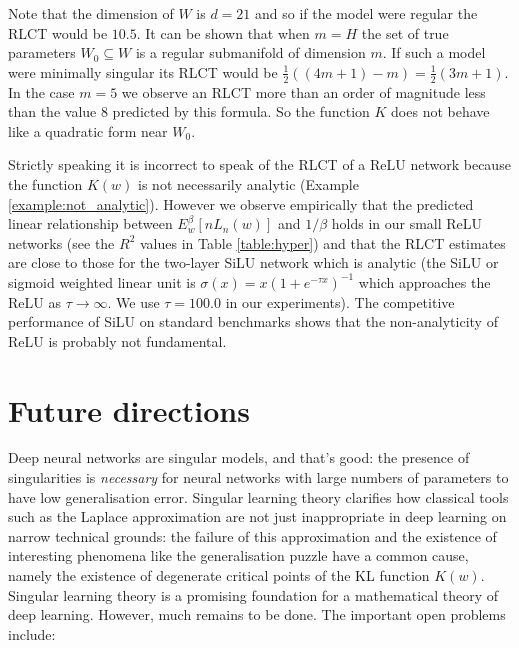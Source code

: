 \documentclass[11pt]{article}
\numberwithin{equation}{section}
\theoremstyle{plain}
\theoremstyle{definition}
\begin{document}
Note that the dimension of $W$ is $d = 21$ and so if the model were regular the RLCT would be $10.5$. It can be shown that when $m = H$ the set of true parameters $W_0 \subseteq W$ is a regular submanifold of dimension $m$. If such a model were minimally singular its RLCT would be $\tfrac{1}{2}( (4m + 1) - m ) = \tfrac{1}{2}( 3m + 1 )$. In the case $m = 5$ we observe an RLCT more than an order of magnitude less than the value $8$ predicted by this formula. So the function $K$ does not behave like a quadratic form near $W_0$.

Strictly speaking it is incorrect to speak of the RLCT of a ReLU network because the function $K(w)$ is not necessarily analytic (Example \ref{example:not_analytic}). However we observe empirically that the predicted linear relationship between $E^\beta_w[nL_n(w)]$ and $1/\beta$ holds in our small ReLU networks (see the $R^2$ values in Table \ref{table:hyper}) and that the RLCT estimates are close to those for the two-layer SiLU network \citep{hendrycks2016gaussian} which is analytic (the SiLU or sigmoid weighted linear unit is $\sigma(x) = x (1 + e^{-\tau x})^{-1}$ which approaches the ReLU as $\tau \to \infty$. We use $\tau = 100.0$ in our experiments). The competitive performance of SiLU on standard benchmarks \citep{ramachandran2017swish} shows that the non-analyticity of ReLU is probably not fundamental.


\section{Future directions}

Deep neural networks are singular models, and that's good: the presence of singularities is \emph{necessary} for neural networks with large numbers of parameters to have low generalisation error. Singular learning theory clarifies how classical tools such as the Laplace approximation are not just inappropriate in deep learning on narrow technical grounds: the failure of this approximation and the existence of interesting phenomena like the generalisation puzzle have a common cause, namely the existence of degenerate critical points of the KL function $K(w)$. 
Singular learning theory is a promising foundation for a mathematical theory of deep learning. However, much remains to be done. The important open problems include:
\end{document}
